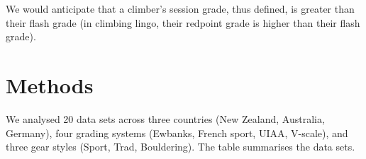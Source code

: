 \documentclass{article}
\begin{document}
We would anticipate that a climber's session grade, thus defined, is greater than their flash grade (in climbing lingo, their redpoint grade is higher than their flash grade). 

%
%
%
%
%
%

\section*{Methods}

We analysed 20 data sets across three countries (New Zealand, Australia, Germany),  four grading systems (Ewbanks, French sport, UIAA, V-scale), and three gear styles (Sport, Trad, Bouldering). The table summarises the data sets.


\afterpage{%
    \clearpage%
    \thispagestyle{empty}%
    \begin{landscape}%
       
    \end{landscape}
    \clearpage%
}
\end{document}
